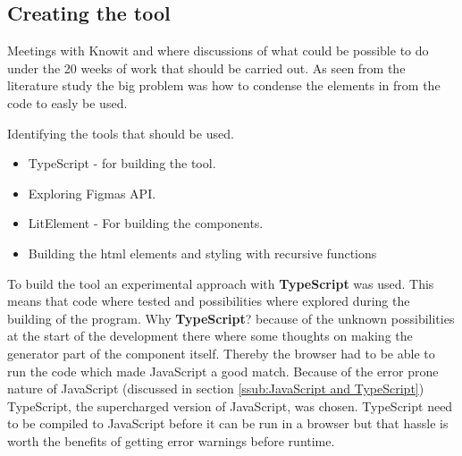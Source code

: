 


\subsection{Creating the tool}%
\label{sub:}


Meetings with Knowit and where discussions of what could be possible to do under the 20 weeks of work that should be carried out. As seen from the literature study the big problem was how to condense the elements in from the code to easly be used. 

Identifying the tools that should be used.
\begin{itemize}
  \item TypeScript - for building the tool.
  \item Exploring Figmas API.
  \item LitElement - For building the components. 
  \item Building the html elements and styling with recursive functions
\end{itemize}

To build the tool an experimental approach with \textbf{TypeScript} was used. This means that code where tested and possibilities where explored during the building of the program. Why \textbf{TypeScript}? because of the unknown possibilities at the start of the development there where some thoughts on making the generator part of the component itself. Thereby the browser had to be able to run the code which made JavaScript a good match. Because of the error prone nature of JavaScript (discussed in section \ref{ssub:JavaScript and TypeScript}) TypeScript, the supercharged version of JavaScript, was chosen. TypeScript need to be compiled to JavaScript before it can be run in a browser but that hassle is worth the benefits of getting error warnings before runtime.

